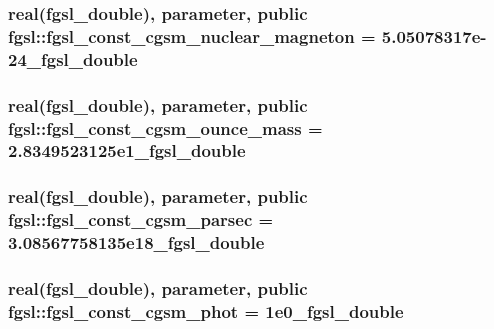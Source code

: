 \hypertarget{classfgsl_a31fef82c84b5351ce89d573f6be1eb8f}{
\subsubsection[{fgsl\-\_\-const\-\_\-cgsm\-\_\-nuclear\-\_\-magneton}]{\setlength{\rightskip}{0pt plus 5cm}real({\bf fgsl\-\_\-double}), parameter, public fgsl\-::fgsl\-\_\-const\-\_\-cgsm\-\_\-nuclear\-\_\-magneton = 5.\-05078317e-\/24\-\_\-fgsl\-\_\-double}}\label{classfgsl_a31fef82c84b5351ce89d573f6be1eb8f}
\hypertarget{classfgsl_aef077a68e7fdd2fe6ec932a7f3c1e8bc}{
\subsubsection[{fgsl\-\_\-const\-\_\-cgsm\-\_\-ounce\-\_\-mass}]{\setlength{\rightskip}{0pt plus 5cm}real({\bf fgsl\-\_\-double}), parameter, public fgsl\-::fgsl\-\_\-const\-\_\-cgsm\-\_\-ounce\-\_\-mass = 2.\-8349523125e1\-\_\-fgsl\-\_\-double}}\label{classfgsl_aef077a68e7fdd2fe6ec932a7f3c1e8bc}
\hypertarget{classfgsl_a3eb251959ceffa5d3604d70bd5279f02}{
\subsubsection[{fgsl\-\_\-const\-\_\-cgsm\-\_\-parsec}]{\setlength{\rightskip}{0pt plus 5cm}real({\bf fgsl\-\_\-double}), parameter, public fgsl\-::fgsl\-\_\-const\-\_\-cgsm\-\_\-parsec = 3.\-08567758135e18\-\_\-fgsl\-\_\-double}}\label{classfgsl_a3eb251959ceffa5d3604d70bd5279f02}
\hypertarget{classfgsl_a97e19ca0cdcef10fb78328e155bc5671}{
\subsubsection[{fgsl\-\_\-const\-\_\-cgsm\-\_\-phot}]{\setlength{\rightskip}{0pt plus 5cm}real({\bf fgsl\-\_\-double}), parameter, public fgsl\-::fgsl\-\_\-const\-\_\-cgsm\-\_\-phot = 1e0\-\_\-fgsl\-\_\-double}}\label{classfgsl_a97e19ca0cdcef10fb78328e155bc5671}
